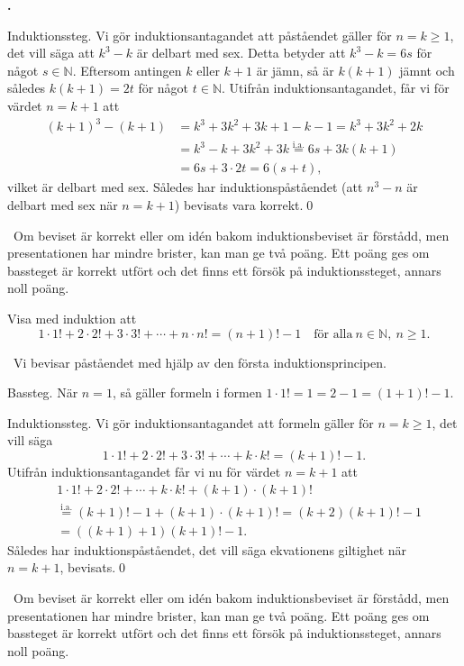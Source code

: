\documentclass[11pt,a4paper,oneside,notitlepage,final]{article}
\newcommand{\N}{\mathbb{N}}
\newcounter{harjnro}
\newenvironment{harjlist}
  {\begin{list}{\kor{\arabic{harjnro}.}}
    {\usecounter{harjnro}
      \setlength{\labelwidth}{0em}
      \setlength{\labelsep}{0.4em}
      \setlength{\leftmargin}{0pt}
      \setlength{\parsep}{5pt}
      \setlength{\itemindent}{0.4em}
      \setlength{\topsep}{0.5\parskip}
      \setlength{\itemsep}{0.75\parskip}
    }
  }
  {\end{list}}
\newcommand{\kor}[1]{\textbf{#1}}
\begin{document}
\begin{harjlist}
Induktionssteg. Vi gör induktionsantagandet att påståendet gäller för $n=k \geq 1$, det vill säga att $k^3-k$ är delbart med sex. Detta betyder att $k^3-k=6s$ för något $s\in\mathbb{N}$.
Eftersom antingen $k$ eller $k+1$ är jämn, så är $k(k+1)$ jämnt och således $k(k+1)=2t$ för något $t\in\mathbb{N}$. Utifrån induktionsantagandet, får vi för värdet $n=k+1$ att
\begin{align*}
(k+1)^3-(k+1)&=k^3+3k^2+3k+1-k-1=k^3+3k^2+2k\\
&=k^3-k+3k^2+3k \overset{\text{i.a.}}{=} 6s + 3k(k+1)\\
&=6s + 3\cdot 2t = 6(s+t),
\end{align*}
vilket är delbart med sex. Således har induktionspåståendet (att $n^3-n$ är delbart med sex när $n=k+1$) bevisats vara korrekt.\qed


\bedomning \
Om beviset är korrekt eller om idén bakom induktionsbeviset är förstådd, men presentationen har mindre brister, kan man ge två poäng. Ett poäng ges om bassteget är korrekt utfört och det finns ett försök på induktionssteget, annars noll poäng.


\item[3.] Visa med induktion att  
\[
1\cdot 1!+2\cdot 2!+3\cdot 3!+\cdots+n\cdot n!=(n+1)!-1\quad\text{för alla}\ n\in\N,\ n\geqslant 1.
\]

\vspace{0.4cm}
\losning \
Vi bevisar påståendet med hjälp av den första induktionsprincipen.

Bassteg. När $n=1$, så gäller formeln i formen $1\cdot 1!=1=2-1=(1+1)!-1$.

Induktionssteg. Vi gör induktionsantagandet att formeln gäller för $n=k \geq 1$, det vill säga
\[
1\cdot 1!+2\cdot 2!+3\cdot 3!+\cdots+k\cdot k!=(k+1)!-1.
\]
Utifrån induktionsantagandet får vi nu för värdet $n=k+1$ att
\begin{align*}
&1\cdot 1!+2\cdot 2!+\cdots+k\cdot k!+(k+1)\cdot(k+1)!\\
&\overset{\text{i.a.}}{=}(k+1)!-1+(k+1)\cdot(k+1)!=(k+2)(k+1)!-1\\
&=((k+1)+1)(k+1)!-1.
\end{align*}
Således har induktionspåståendet, det vill säga ekvationens giltighet när $n=k+1$, bevisats.\qed


\bedomning \
Om beviset är korrekt eller om idén bakom induktionsbeviset är förstådd, men presentationen har mindre brister, kan man ge två poäng. Ett poäng ges om bassteget är korrekt utfört och det finns ett försök på induktionssteget, annars noll poäng.



\end{harjlist}
\end{document}
